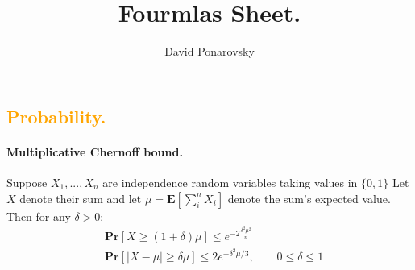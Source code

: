 \documentclass{article}
\newcommand{\prb}[1]{ \mathbf{Pr} \left[ {#1} \right]}
\newcommand{\expp}[1]{ \mathbf{E} \left[ {#1} \right]}
\begin{document}
\title{Fourmlas Sheet.} 
\author{David Ponarovsky}
\maketitle
\begin{multicols*}{2}
  \subsection*{{\textcolor{orange}{Probability.}} } 
  \paragraph{Multiplicative Chernoff bound.} Suppose $ X_1, ..., X_n$ are independence random variables taking values in $\{0, 1\}$ Let $X$ denote their sum and let $\mu = \expp{\sum_{i}^{n}{X_{i}}} $  denote the sum's expected value. Then for any $\delta > 0$: 
  \begin{equation*}
    \begin{split}
      & \prb{X \ge \left( 1+\delta \right) \mu }  \le e^{-2\frac{\delta^2\mu^{2}}{n}} \\ 
      & \prb{|X - \mu| \ge \delta\mu }  \le 2e^{-\delta^2\mu/3}, \qquad 0 \le \delta \le 1
    \end{split}
  \end{equation*}

\end{multicols*}
\end{document}
